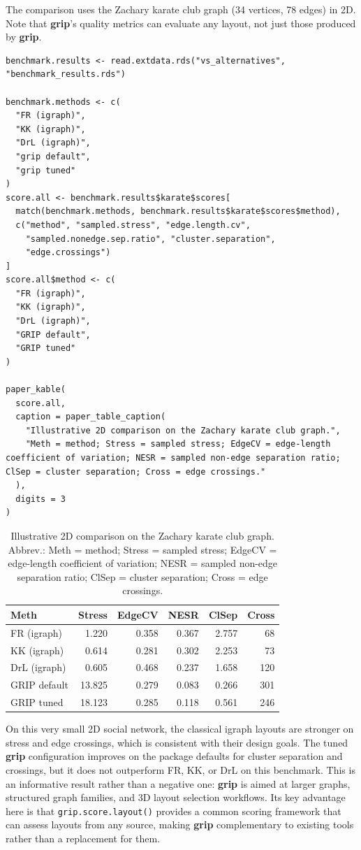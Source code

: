 The comparison uses the Zachary karate club graph (34 vertices, 78 edges)
in 2D. Note that \textbf{grip}'s quality metrics can evaluate any layout, not
just those produced by \textbf{grip}.

\begin{verbatim}
benchmark.results <- read.extdata.rds("vs_alternatives", "benchmark_results.rds")

benchmark.methods <- c(
  "FR (igraph)",
  "KK (igraph)",
  "DrL (igraph)",
  "grip default",
  "grip tuned"
)
score.all <- benchmark.results$karate$scores[
  match(benchmark.methods, benchmark.results$karate$scores$method),
  c("method", "sampled.stress", "edge.length.cv",
    "sampled.nonedge.sep.ratio", "cluster.separation",
    "edge.crossings")
]
score.all$method <- c(
  "FR (igraph)",
  "KK (igraph)",
  "DrL (igraph)",
  "GRIP default",
  "GRIP tuned"
)

paper_kable(
  score.all,
  caption = paper_table_caption(
    "Illustrative 2D comparison on the Zachary karate club graph.",
    "Meth = method; Stress = sampled stress; EdgeCV = edge-length coefficient of variation; NESR = sampled non-edge separation ratio; ClSep = cluster separation; Cross = edge crossings."
  ),
  digits = 3
)
\end{verbatim}

\begin{table}

\caption{\label{tab:unnamed-chunk-13}Illustrative 2D comparison on the Zachary karate club graph. Abbrev.: Meth = method; Stress = sampled stress; EdgeCV = edge-length coefficient of variation; NESR = sampled non-edge separation ratio; ClSep = cluster separation; Cross = edge crossings.}
\centering
\begin{tabular}[t]{l|r|r|r|r|r}
\hline
Meth & Stress & EdgeCV & NESR & ClSep & Cross\\
\hline
FR (igraph) & 1.220 & 0.358 & 0.367 & 2.757 & 68\\
\hline
KK (igraph) & 0.614 & 0.281 & 0.302 & 2.253 & 73\\
\hline
DrL (igraph) & 0.605 & 0.468 & 0.237 & 1.658 & 120\\
\hline
GRIP default & 13.825 & 0.279 & 0.083 & 0.266 & 301\\
\hline
GRIP tuned & 18.123 & 0.285 & 0.118 & 0.561 & 246\\
\hline
\end{tabular}
\end{table}

On this very small 2D social network, the classical igraph layouts are
stronger on stress and edge crossings, which is consistent with their design
goals. The tuned \textbf{grip} configuration improves on the package defaults for
cluster separation and crossings, but it does not outperform FR, KK, or DrL
on this benchmark. This is an informative result rather than a negative one:
\textbf{grip} is aimed at larger graphs, structured graph families, and 3D layout
selection workflows. Its key advantage here is that \texttt{grip.score.layout()}
provides a common scoring framework that can assess layouts from any source,
making \textbf{grip} complementary to existing tools rather than a replacement for
them.

